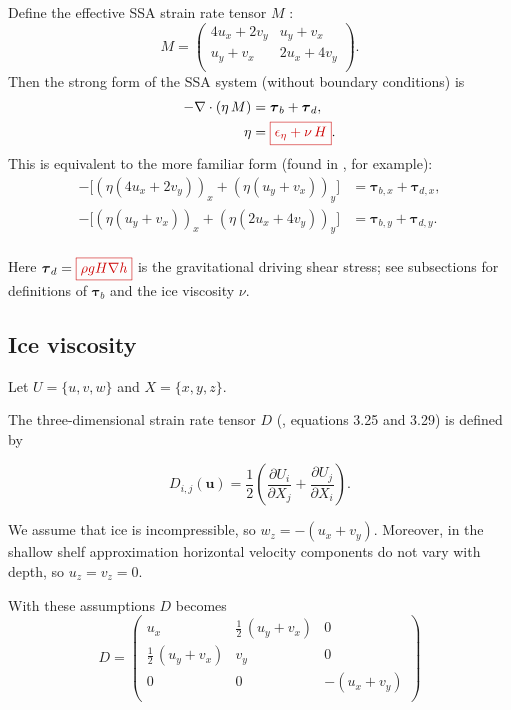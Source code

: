 \documentclass{amsart}
\newcommand{\diff}[2]{\ensuremath{\frac{\partial #1}{\partial #2}}}
\newcommand{\basalshearstress}[1]{\boldsymbol{\tau}_{b#1}}
\newcommand{\taub}{\basalshearstress{}}
\newcommand{\taubx}{\basalshearstress{,x}}
\newcommand{\tauby}{\basalshearstress{,y}}
\newcommand{\drivingstress}[1]{\boldsymbol{\tau}_{d#1}}
\newcommand{\taud}{\drivingstress{}}
\newcommand{\taudx}{\drivingstress{,x}}
\newcommand{\taudy}{\drivingstress{,y}}
\newcommand{\highlight}[1]{{\color{red!80!black} \fbox{$ \displaystyle #1 $} }}
\begin{document}
Define the effective SSA strain rate tensor $M$ \cite{Dukowiczetal2010}:
\begin{equation*}
  M =
    \begin{pmatrix}
      4u_x + 2v_y & u_y + v_x\\
      u_y + v_x & 2u_x + 4v_y\\
    \end{pmatrix}.
\end{equation*}
Then the strong form of the SSA system (without boundary conditions) is
\begin{align}
  \label{eq:12}
  - \nabla\cdot(\eta\, M) & = \taub + \taud,\\
  \label{eq:13}
  \eta &= \highlight{ \epsilon_{\eta} + \nu\, H }.
\end{align}
This is equivalent to the more familiar form (found in \cite{SchoofStream}, for example):
\begin{align*}
 - \Big[ (\eta (4 u_x + 2 v_y))_x + (\eta (u_y + v_x))_y \Big] & = \taubx + \taudx, \\
 - \Big[ (\eta (u_y + v_x))_x + (\eta (2 u_x + 4 v_y))_y \Big] & = \tauby + \taudy.\\
\end{align*}

Here $\taud = \highlight{ \rho g H \nabla h }$ is the gravitational driving shear stress; see subsections for definitions of $\taub$ and the ice viscosity $\nu$.


\subsection{Ice viscosity}
\label{sec:ice-viscosity}

Let $U = \{u,v,w\}$ and $X = \{x, y, z\}$.

The three-dimensional strain rate tensor $D$ (\cite{GreveBlatter2009}, equations 3.25 and 3.29) is defined by

\begin{equation*}
  D_{i,j}(\boldsymbol{u}) = \frac 12 \left( \diff{U_i}{X_j} + \diff{U_j}{X_i} \right).
\end{equation*}

We assume that ice is incompressible, so $w_z = - (u_x + v_y)$. Moreover, in the shallow shelf approximation horizontal velocity components do not vary with depth, so $u_z = v_z = 0$.

With these assumptions $D$ becomes
\begin{equation*}
  D =
  \begin{pmatrix}
    u_x & \frac{1}{2}\,(u_y + v_x) & 0\\
    \frac{1}{2}\,(u_y + v_x) & v_y & 0\\
    0 & 0 & - (u_x + v_y)\\
  \end{pmatrix}
\end{equation*}
\end{document}
